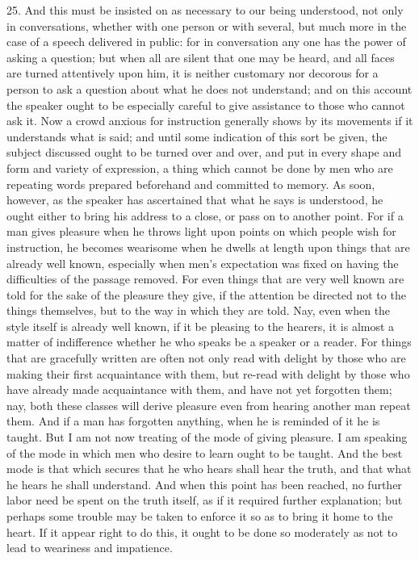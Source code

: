25. And this must be insisted on as necessary to our being understood, not only in conversations, whether with one person or with several, but much more in the case of a speech delivered in public: for in conversation any one has the power of asking a question; but when all are silent that one may be heard, and all faces are turned attentively upon him, it is neither customary nor decorous for a person to ask a question about what he does not understand; and on this account the speaker ought to be especially careful to give assistance to those who cannot ask it. Now a crowd anxious for instruction generally shows by its movements if it understands what is said; and until some indication of this sort be given, the subject discussed ought to be turned over and over, and put in every shape and form and variety of expression, a thing which cannot be done by men who are repeating words prepared beforehand and committed to memory. As soon, however, as the speaker has ascertained that what he says is understood, he ought either to bring his address to a close, or pass on to another point. For if a man gives pleasure when he throws light upon points on which people wish for instruction, he becomes wearisome when he dwells at length upon things that are already well known, especially when men’s expectation was fixed on having the difficulties of the passage removed. For even things that are very well known are told for the sake of the pleasure they give, if the attention be directed not to the things themselves, but to the way in which they are told. Nay, even when the style itself is already well known, if it be pleasing to the hearers, it is almost a matter of indifference whether he who speaks be a speaker or a reader. For things that are gracefully written are often not only read with delight by those who are making their first acquaintance with them, but re-read with delight by those who have already made acquaintance with them, and have not yet forgotten them; nay, both these classes will derive pleasure even from hearing another man repeat them. And if a man has forgotten anything, when he is reminded of it he is taught. But I am not now treating of the mode of giving pleasure. I am speaking of the mode in which men who desire to learn ought to be taught. And the best mode is that which secures that he who hears shall hear the truth, and that what he hears he shall understand. And when this point has been reached, no further labor need be spent on the truth itself, as if it required further explanation; but perhaps some trouble may be taken to enforce it so as to bring it home to the heart. If it appear right to do this, it ought to be done so moderately as not to lead to weariness and impatience.

